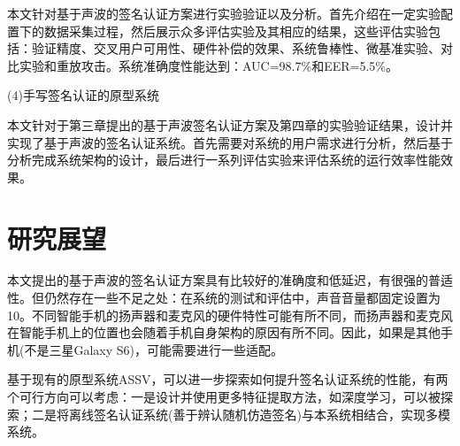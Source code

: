 本文针对基于声波的签名认证方案进行实验验证以及分析。首先介绍在一定实验配置下的数据采集过程，然后展示众多评估实验及其相应的结果，这些评估实验包括：验证精度、交叉用户可用性、硬件补偿的效果、系统鲁棒性、微基准实验、对比实验和重放攻击。系统准确度性能达到：AUC=98.7\%和EER=5.5\%。

(4)手写签名认证的原型系统

本文针对于第三章提出的基于声波签名认证方案及第四章的实验验证结果，设计并实现了基于声波的签名认证系统。首先需要对系统的用户需求进行分析，然后基于分析完成系统架构的设计，最后进行一系列评估实验来评估系统的运行效率性能效果。

\section{研究展望}
本文提出的基于声波的签名认证方案具有比较好的准确度和低延迟，有很强的普适性。但仍然存在一些不足之处：在系统的测试和评估中，声音音量都固定设置为10。不同智能手机的扬声器和麦克风的硬件特性可能有所不同，而扬声器和麦克风在智能手机上的位置也会随着手机自身架构的原因有所不同。因此，如果是其他手机(不是三星Galaxy S6)，可能需要进行一些适配。

基于现有的原型系统ASSV，可以进一步探索如何提升签名认证系统的性能，有两个可行方向可以考虑：一是设计并使用更多特征提取方法，如深度学习，可以被探索；二是将离线签名认证系统(善于辨认随机仿造签名)与本系统相结合，实现多模系统。
